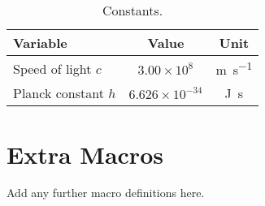 \documentclass[11pt,a4paper]{article}
\theoremstyle{plain}
\theoremstyle{definition}
\theoremstyle{remark}
\begin{document}
\begin{table}[h]
  \centering
  \begin{tabular}{lcc}
    \toprule
    \textbf{Variable} & \textbf{Value} & \textbf{Unit}\\
    \midrule
    Speed of light $c$ & $3.00\times10^8$ & \si{\metre\per\second}\\
    Planck constant $h$ & $6.626\times10^{-34}$ & \si{\joule\second}\\
    \bottomrule
  \end{tabular}
  \caption{Constants.}
\end{table}

\appendix
\section{Extra Macros}
Add any further macro definitions here.

\end{document}

